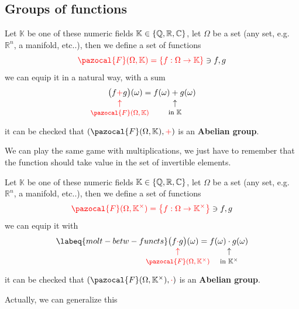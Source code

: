 \documentclass[../main.tex]{subfiles}
\begin{document}
\subsection{Groups of functions}
\begin{example}
Let $\mathbb{K}$ be one of these numeric fields $\mathbb{K}\in\qty{\mathbb{Q},\mathbb{R},\mathbb{C}}$, let $\Omega$ be a set (any set, e.g. $\mathbb{R}^n$, a manifold, etc..), then we define a set of functions
\[
{\color{red}\pazocal{F}(\Omega,\mathbb{K})=\qty{f:\Omega \to \mathbb{K}}}\ni f,g
\]
we can equip it in a natural way, with a sum
\[
\big(f{\color{red}\underset{\mathclap{\tikz \node {$\uparrow$} node [below=1ex]{\footnotesize $\pazocal{F}(\Omega,\mathbb{K})$ };}}{+}}g\big)(\omega)=f(\omega)\underset{\mathclap{\tikz \node {$\uparrow$} node [below=1ex]{\footnotesize in $\mathbb{K}$ };}}{+}g(\omega)
\]
it can be checked that $\pqty{\pazocal{F}(\Omega, \mathbb{K}), {\color{red}+}}$ is an \textbf{Abelian group}.
\end{example}
We can play the same game with multiplications, we just have to remember that the function should take value in the set of invertible elements.
\begin{example}
Let $\mathbb{K}$ be one of these numeric fields $\mathbb{K}\in\qty{\mathbb{Q},\mathbb{R},\mathbb{C}}$, let $\Omega$ be a set (any set, e.g. $\mathbb{R}^n$, a manifold, etc..), then we define a set of functions
\[
{\color{red}\pazocal{F}(\Omega,\mathbb{K}^\times)=\qty{f:\Omega \to \mathbb{K}^\times}}\ni f,g
\]
we can equip it with
\begin{equation}\labeq{molt-betw-functs}
\big(f{\color{red}\underset{\mathclap{\tikz \node {$\uparrow$} node [below=1ex]{\footnotesize $\pazocal{F}(\Omega,\mathbb{K}^\times)$ };}}{\cdot}}g\big)(\omega)=f(\omega)\underset{\mathclap{\tikz \node {$\uparrow$} node [below=1ex]{\footnotesize in $\mathbb{K}^\times$ };}}{\cdot}g(\omega)
\end{equation}
it can be checked that $\pqty{\pazocal{F}(\Omega, \mathbb{K}^\times), {\color{red}\cdot}}$ is an \textbf{Abelian group}.
\end{example}
Actually, we can generalize this
\end{document}
